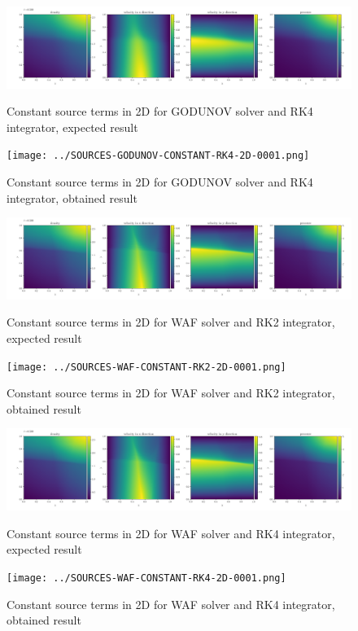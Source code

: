     \begin{figure}[htbp]
        \centering
        \includegraphics[width=.9\textwidth]{./figures/SOURCES-GODUNOV-CONSTANT-RK4-2D-0001.png}%
        \caption{Constant source terms in 2D for GODUNOV solver and RK4 integrator, expected result}
        \texttt{[image: ../SOURCES-GODUNOV-CONSTANT-RK4-2D-0001.png]}%
        \caption{Constant source terms in 2D for GODUNOV solver and RK4 integrator, obtained result}
    \end{figure}



    \begin{figure}[htbp]
        \centering
        \includegraphics[width=.9\textwidth]{./figures/SOURCES-WAF-CONSTANT-RK2-2D-0001.png}%
        \caption{Constant source terms in 2D for WAF solver and RK2 integrator, expected result}
        \texttt{[image: ../SOURCES-WAF-CONSTANT-RK2-2D-0001.png]}%
        \caption{Constant source terms in 2D for WAF solver and RK2 integrator, obtained result}
    \end{figure}

    \begin{figure}[htbp]
        \centering
        \includegraphics[width=.9\textwidth]{./figures/SOURCES-WAF-CONSTANT-RK4-2D-0001.png}%
        \caption{Constant source terms in 2D for WAF solver and RK4 integrator, expected result}
        \texttt{[image: ../SOURCES-WAF-CONSTANT-RK4-2D-0001.png]}%
        \caption{Constant source terms in 2D for WAF solver and RK4 integrator, obtained result}
    \end{figure}



